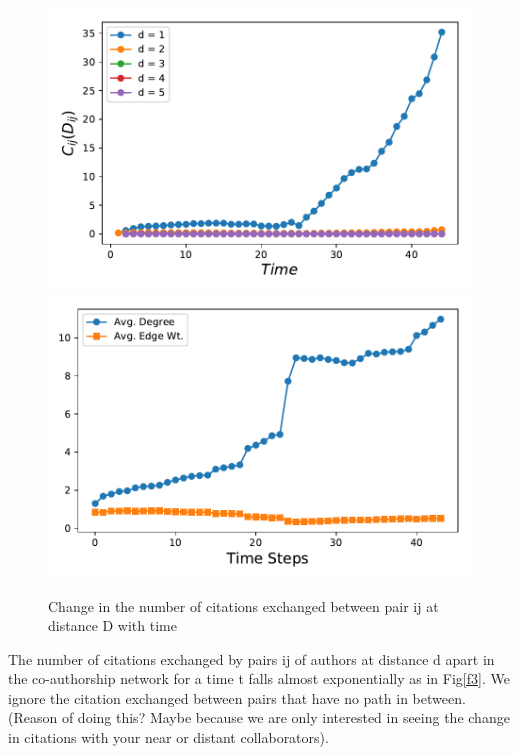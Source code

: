 \documentclass[aps, pre, twocolumn, nofootinbib]{revtex4-1}
\begin{document}
\begin{figure}
	\centering

	\includegraphics[scale = 0.49]{plots/fig2}
	\includegraphics[scale = 0.49]{plots/fig3}
	\captionsetup{singlelinecheck=false, justification=raggedright,  labelsep=space}
	
	\caption{Change in the number of citations exchanged between pair ij at distance D with time}
	\label{f3a}
\end{figure}

The number of citations exchanged by pairs ij of authors at distance d apart in the co-authorship network for a time t falls almost exponentially as in Fig\ref{f3}. We ignore the citation exchanged between pairs that have no path in between.(Reason of doing this? Maybe because we are only interested in seeing the change in citations with your near or distant collaborators).
\end{document}
